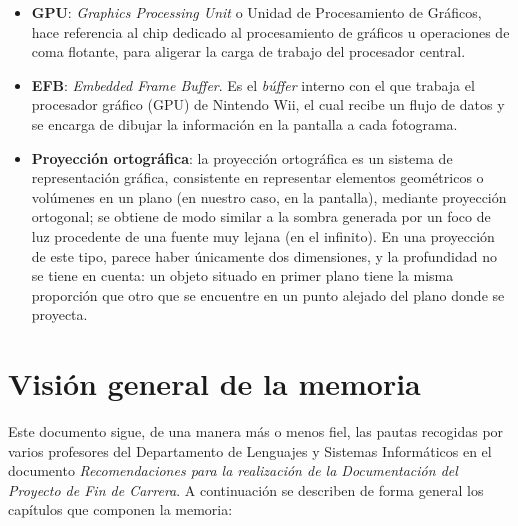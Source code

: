 \begin{itemize}
\item \textbf{GPU}: \emph{Graphics Processing Unit} o Unidad de Procesamiento de Gráficos, hace referencia al chip dedicado al procesamiento de gráficos u operaciones de coma flotante, para aligerar la carga de trabajo del procesador central.
\item \textbf{EFB}: \emph{Embedded Frame Buffer}. Es el \emph{búffer} interno con el que trabaja el procesador gráfico (GPU) de Nintendo Wii, el cual recibe un flujo de datos y se encarga de dibujar la información en la pantalla a cada fotograma.
\item \textbf{Proyección ortográfica}: la proyección ortográfica es un sistema de representación gráfica, consistente en representar elementos geométricos o volúmenes en un plano (en nuestro caso, en la pantalla), mediante proyección ortogonal; se obtiene de modo similar a la sombra generada por un foco de luz procedente de una fuente muy lejana (en el infinito). En una proyección de este tipo, parece haber únicamente dos dimensiones, y la profundidad no se tiene en cuenta: un objeto situado en primer plano tiene la misma proporción que otro que se encuentre en un punto alejado del plano donde se proyecta.
\end{itemize}

\section{Visión general de la memoria}

Este documento sigue, de una manera más o menos fiel, las pautas recogidas por varios profesores del Departamento de Lenguajes y Sistemas Informáticos en el documento \emph{Recomendaciones para la realización de la Documentación del Proyecto de Fin de Carrera}. A continuación se describen de forma general los capítulos que componen la memoria:

